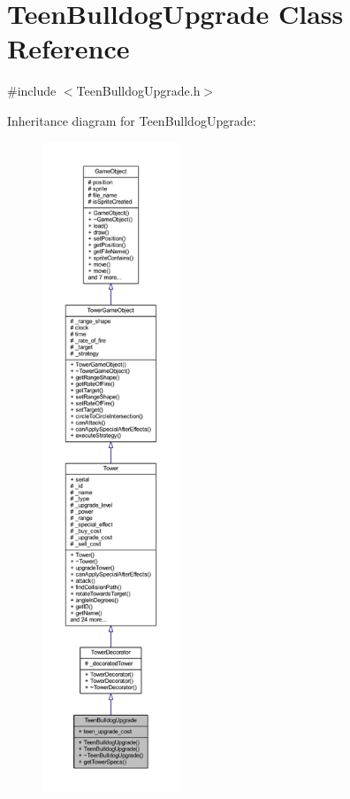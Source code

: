 \hypertarget{class_teen_bulldog_upgrade}{\section{Teen\+Bulldog\+Upgrade Class Reference}
\label{class_teen_bulldog_upgrade}
}


{\ttfamily \#include $<$Teen\+Bulldog\+Upgrade.\+h$>$}



Inheritance diagram for Teen\+Bulldog\+Upgrade\+:
\nopagebreak
\begin{figure}[H]
\begin{center}
\leavevmode
\includegraphics[height=550pt]{class_teen_bulldog_upgrade__inherit__graph}
\end{center}
\end{figure}


